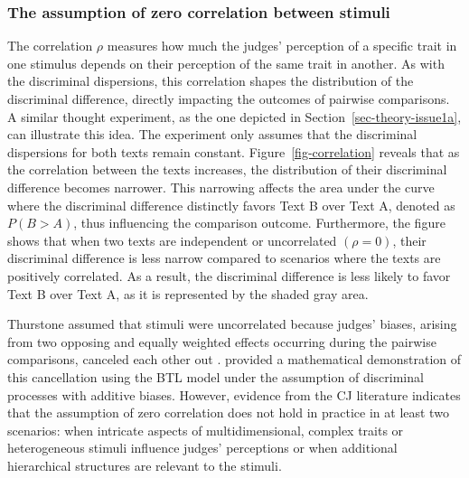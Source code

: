 \documentclass[
  authoryear,
  review,
  1p]{elsarticle}
\begin{document}
\subsubsection{The assumption of zero correlation between
stimuli}\label{sec-theory-issue1b}

The correlation \(\rho\) measures how much the judges' perception of a
specific trait in one stimulus depends on their perception of the same
trait in another. As with the discriminal dispersions, this correlation
shapes the distribution of the discriminal difference, directly
impacting the outcomes of pairwise comparisons. A similar thought
experiment, as the one depicted in Section~\ref{sec-theory-issue1a}, can
illustrate this idea. The experiment only assumes that the discriminal
dispersions for both texts remain constant. Figure~\ref{fig-correlation}
reveals that as the correlation between the texts increases, the
distribution of their discriminal difference becomes narrower. This
narrowing affects the area under the curve where the discriminal
difference distinctly favors Text B over Text A, denoted as
\(P(B > A)\), thus influencing the comparison outcome. Furthermore, the
figure shows that when two texts are independent or uncorrelated
\((\rho=0)\), their discriminal difference is less narrow compared to
scenarios where the texts are positively correlated. As a result, the
discriminal difference is less likely to favor Text B over Text A, as it
is represented by the shaded gray area.

Thurstone assumed that stimuli were uncorrelated because judges' biases,
arising from two opposing and equally weighted effects occurring during
the pairwise comparisons, canceled each other out
\citep{Thurstone_1927b}. \citet{Andrich_1978} provided a mathematical
demonstration of this cancellation using the BTL model under the
assumption of discriminal processes with additive biases. However,
evidence from the CJ literature indicates that the assumption of zero
correlation does not hold in practice in at least two scenarios: when
intricate aspects of multidimensional, complex traits or heterogeneous
stimuli influence judges' perceptions or when additional hierarchical
structures are relevant to the stimuli.
\end{document}
